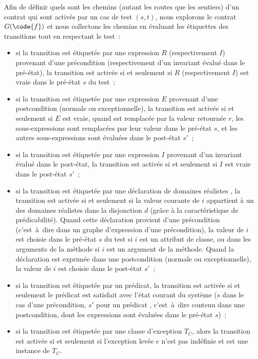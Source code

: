 Afin de définir quels sont les chemins (autant les routes que les sentiers) d'un
contrat qui sont activés par un cas de test $(s, t)$, nous explorons le contrat
$G(\code{f})$ et nous collectons les chemins en évaluant les étiquettes des
transitions tout en respectant le test~:
%
\begin{itemize}

\item si la transition est étiquetée par une expression $R$ (respectivement
$I$) provenant d'une précondition (respectivement d'un invariant évalué dans le
pré-état), la transition est activée si et seulement si $R$ (respectivement $I$)
est vraie dans le pré-état $s$ du test~;

\item si la transition est étiquetée par une expression $E$ provenant d'une
postcondition (normale ou exceptionnelle), la transition est activée si et
seulement si $E$ est vraie, quand \aresult est remplacée par la valeur retournée
$r$, les sous-expressions \aold{\empty} sont remplacées par leur valeur dans le
pré-état $s$, et les autres sous-expressions sont évaluées dans le post-état
$s'$~;

\item si la transition est étiquetée par une expression $I$ provenant d'un
invariant évalué dans le post-état, la transition est activée si et seulement si
$I$ est vraie dans le post-état $s'$~;

\item si la transition est étiquetée par une déclaration de domaines réalistes
, la transition est activée si et seulement si la valeur courante
de $i$ appartient à un des domaines réalistes dans la disjonction $d$ (grâce à
la caractéristique de prédicabilité). Quand cette déclaration provient d'une
précondition (c'est~à~dire dans un graphe d'expression d'une précondition), la
valeur de $i$ est choisie dans le pré-état $s$ du test si $i$ est un attribut de
classe, ou dans les arguments de la méthode si $i$ est un argument de la
méthode. Quand la déclaration est exprimée dans une postcondition (normale ou
exceptionnelle), la valeur de $i$ est choisie dans le post-état $s'$~;

\item si la transition est étiquetée par un prédicat, la transition est activée
si et seulement le prédicat est satisfait avec l'état courant du système ($s$
dans le cas d'une précondition, $s'$ pour un prédicat ,
c'est~à~dire contenu dans une postcondition, dont les expressions \aold{\empty}
sont évaluées dans le pré-état $s$)~;

\item si la transition est étiquetée par une classe d'exception $T_C$, alors la
transition est activée si et seulement si l'exception levée $e$ n'est pas
indéfinie et est une instance de $T_C$.

\end{itemize}

